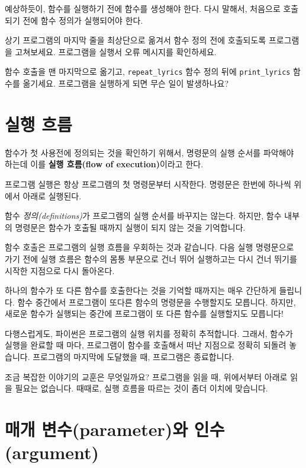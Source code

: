 
예상하듯이, 함수를 실행하기 전에 함수를 생성해야 한다. 다시 말해서, 처음으로 호출되기 전에
함수 정의가 실행되어야 한다.

\begin{ex}
상기 프로그램의 마지막 줄을 최상단으로 옮겨서 함수 정의 전에 호출되도록 프로그램을 고쳐보세요.
프로그램을 실행서 오류 메시지를 확인하세요.
\end{ex}

\begin{ex}
함수 호출을 맨 마지막으로 옮기고, \verb"repeat_lyrics" 함수 정의 뒤에 \verb"print_lyrics" 함수를 옮기세요.
프로그램을 실행하게 되면 무슨 일이 발생하나요?
\end{ex}


\section{실행 흐름}

함수가 첫 사용전에 정의되는 것을 확인하기 위해서, 명령문의 실행 순서를 파악해야 하는데 이를 {\bf 실행 흐름(flow of execution)}이라고 한다.

프로그램 실행은 항상 프로그램의 첫 명령문부터 시작한다. 명령문은 한번에 하나씩 위에서 아래로 실행된다.

함수 \emph{정의(definitions)}가 프로그램의 실행 순서를 바꾸지는 않는다. 하지만, 함수 내부의 명령문은 함수가 호출될 때까지 실행이 되지 않는 것을 기억합니다. 

함수 호출은 프로그램의 실행 흐름을 우회하는 것과 같습니다. 다음 실행 명령문으로 가기 전에 실행 흐름은 함수의 몸통 부문으로 건너 뛰어 실행하고는 다시 건너 뛰기를 
시작한 지점으로 다시 돌아온다.

하나의 함수가 또 다른 함수를 호출한다는 것을 기억할 때까지는 매우 간단하게 들립니다.
함수 중간에서 프로그램이 또다른 함수의 명령문을 수행할지도 모릅니다. 하지만, 새로운 함수가 실행되는 중간에 프로그램이 또 다른 함수를 실행할지도 모릅니다!
 
다행스럽게도, 파이썬은 프로그램의 실행 위치를 정확히 추적합니다. 그래서, 함수가 실행을 완료할 때 마다, 프로그램이 함수를 호출해서 떠난 지점으로 정확히 되돌려 놓습니다. 프로그램의 마지막에 도달했을 때, 프로그램은 종료합니다.

조금 복잡한 이야기의 교훈은 무엇일까요? 프로그램을 읽을 때, 위에서부터 아래로 읽을 필요는 없습니다. 때때로, 실행 흐름을 따르는 것이 좀더 이치에 맞습니다.


\section{매개 변수(parameter)와 인수(argument)}
\label{parameters}

